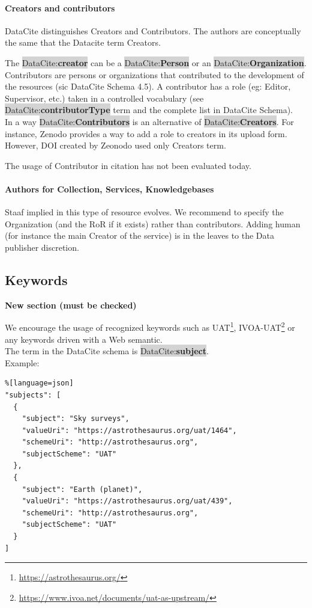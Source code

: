 \documentclass[11pt,a4paper]{ivoa}
\newcommand{\dataciteterm}[1]{\colorbox{lightgray}{DataCite:\textbf{#1}}}
\begin{document}
\paragraph{Creators and contributors}
DataCite distinguishes Creators and Contributors. The authors are conceptually the same that the Datacite term Creators.

The \dataciteterm{creator} can be a \dataciteterm{Person} or an \dataciteterm{Organization}.
Contributors are persons or organizations that contributed to the development of the resources (sic DataCite Schema 4.5).
A contributor has a role (eg: Editor, Supervisor, etc.) taken in a controlled vocabulary (see \dataciteterm{contributorType} term and the complete list in DataCite Schema).\\

In a way \dataciteterm{Contributors} is an alternative of \dataciteterm{Creators}. For instance, Zenodo provides a way to add a role to creators in its upload form. However, DOI created by Zeonodo used only Creators term.

The usage of Contributor in citation has not been evaluated today.


\paragraph{Authors for Collection, Services, Knowledgebases}
Staaf implied in this type of resource evolves. We recommend to specify the Organization (and the RoR if it exists) rather than contributors. Adding human (for instance the main Creator of the service) is in the leaves to the Data publisher discretion.

\subsection{Keywords}
\label{sec:keywords}
\textbf{\color{red}New section (must be checked)}

We encourage the usage of recognized keywords such as UAT\footnote{\url{https://astrothesaurus.org/}}, IVOA-UAT\footnote{\url{https://www.ivoa.net/documents/uat-as-upstream/}} or any keywords driven with a Web semantic.\\

The term in the DataCite schema is \dataciteterm{subject}.\\

Example:\\
\begin{lstlisting}%[language=json]
"subjects": [
  {
    "subject": "Sky surveys",
    "valueUri": "https://astrothesaurus.org/uat/1464",
    "schemeUri": "http://astrothesaurus.org",
    "subjectScheme": "UAT"
  },
  {
    "subject": "Earth (planet)",
    "valueUri": "https://astrothesaurus.org/uat/439",
    "schemeUri": "http://astrothesaurus.org",
    "subjectScheme": "UAT"
  }
]

\end{lstlisting}
\end{document}
